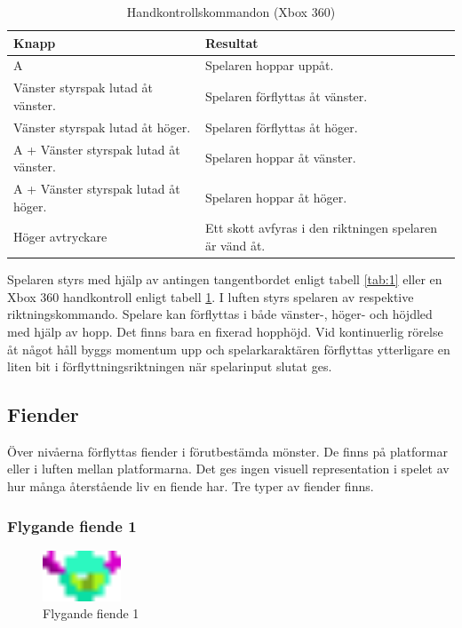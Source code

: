 \documentclass{TDP005mall}
\begin{document}
\begin{table}[h!]
  \caption{Handkontrollskommandon (Xbox 360)\label{tab:2}}
\begin{tabular}{|l|l|}
\hline
Knapp & Resultat \\\hline
A & Spelaren hoppar uppåt. \\\hline
Vänster styrspak lutad åt vänster.  & Spelaren förflyttas åt vänster. \\\hline
Vänster styrspak lutad åt höger. & Spelaren förflyttas åt höger. \\\hline
A + Vänster styrspak lutad åt vänster. & Spelaren hoppar åt vänster. \\\hline
A + Vänster styrspak lutad åt höger. & Spelaren hoppar åt höger. \\\hline
Höger avtryckare & Ett skott avfyras i den riktningen spelaren är vänd åt. \\\hline
\end{tabular}
\end{table}

Spelaren styrs med hjälp av antingen tangentbordet enligt tabell \ref{tab:1} eller en Xbox 360 handkontroll enligt tabell \ref{tab:2}. I luften styrs spelaren av respektive riktningskommando. Spelare kan förflyttas i både vänster-, höger- och höjdled med hjälp av hopp. Det finns bara en fixerad hopphöjd. Vid kontinuerlig rörelse åt något håll byggs momentum upp och spelarkaraktären förflyttas ytterligare en liten bit i förflyttningsriktningen när spelarinput slutat ges.

\subsection{Fiender}
Över nivåerna förflyttas fiender i förutbestämda mönster. De finns på platformar eller i luften mellan platformarna. Det ges ingen visuell representation i spelet av hur många återstående liv en fiende har. Tre typer av fiender finns.

\subsubsection*{Flygande fiende 1}
\begin{figure}[h!]
  \caption{Flygande fiende 1\label{fig:1}}
  \includegraphics[height=1.5cm]{images/sflying_enemy1.png}
\end{figure}
\end{document}
